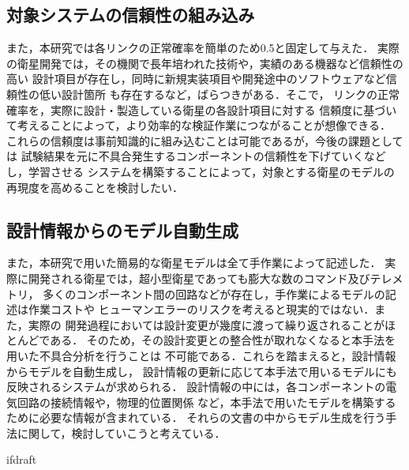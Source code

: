 \documentclass[11pt]{jsreport}
\begin{document}
\subsection{対象システムの信頼性の組み込み}
 また，本研究では各リンクの正常確率を簡単のため0.5と固定して与えた．
 実際の衛星開発では，その機関で長年培われた技術や，実績のある機器など信頼性の高い
 設計項目が存在し，同時に新規実装項目や開発途中のソフトウェアなど信頼性の低い設計箇所
 も存在するなど，ばらつきがある．そこで，
 リンクの正常確率を，実際に設計・製造している衛星の各設計項目に対する
 信頼度に基づいて考えることによって，より効率的な検証作業につながることが想像できる．
これらの信頼度は事前知識的に組み込むことは可能であるが，今後の課題としては
試験結果を元に不具合発生するコンポーネントの信頼性を下げていくなどし，学習させる
システムを構築することによって，対象とする衛星のモデルの再現度を高めることを検討したい．\\

\subsection{設計情報からのモデル自動生成}
また，本研究で用いた簡易的な衛星モデルは全て手作業によって記述した．
実際に開発される衛星では，超小型衛星であっても膨大な数のコマンド及びテレメトリ，%
多くのコンポーネント間の回路などが存在し，手作業によるモデルの記述は作業コストや
ヒューマンエラーのリスクを考えると現実的ではない．また，実際の
開発過程においては設計変更が幾度に渡って繰り返されることがほとんどである．
そのため，その設計変更との整合性が取れなくなると本手法を用いた不具合分析を行うことは
不可能である．これらを踏まえると，設計情報からモデルを自動生成し，
設計情報の更新に応じて本手法で用いるモデルにも反映されるシステムが求められる．
設計情報の中には，各コンポーネントの電気回路の接続情報や，物理的位置関係
など，本手法で用いたモデルを構築するために必要な情報が含まれている．
それらの文書の中からモデル生成を行う手法に関して，検討していこうと考えている．



\begin{comment}
\section{まとめ}



また，故障診断のコンテキストによってどこまで掘り下げるべきか使い分けるべきである
\cite{Ontology1998}ことを書く．

一方で，人工衛星は内部のコンポーネントが非常に密集しているおり，人間が設計時に考慮した
意図したつながりだけでなく，意図しないつながりも多く存在する．
このような意図しないつながりによって，波及効果が発生することが衛星内部の理解が
困難になり
\end{comment}

\expandafter\ifx\csname ifdraft\endcsname\relax
  
\end{document}
